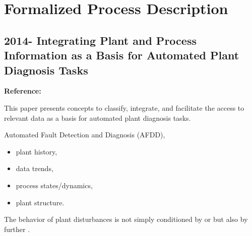 \section{Formalized Process Description}

\crule

\subsection{2014- Integrating Plant and Process Information as a Basis for 
  Automated Plant Diagnosis Tasks}

\textbf{Reference:} \cite{arroyo2014integrating}

This paper presents concepts to classify, integrate, and facilitate the access 
to relevant data as a basis for automated plant diagnosis tasks.

Automated Fault Detection and Diagnosis (AFDD),
\begin{itemize}
  \item plant history,
  \item data trends,
  \item process states/dynamics,
  \item plant structure.
\end{itemize}


The behavior of plant disturbances is not simply conditioned by 
 or  
but also by further .


